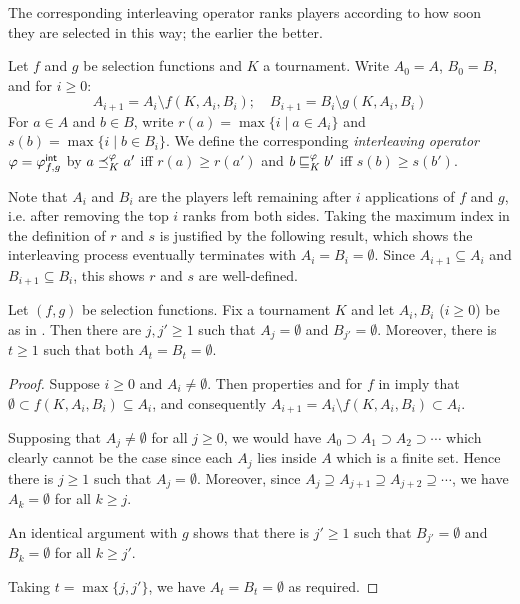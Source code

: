The corresponding interleaving operator ranks players according to how soon
they are selected in this way; the earlier the better.

\begin{definition}%
    \label{tourn_def_interleaving}

    Let $f$ and $g$ be selection functions and $K$ a tournament. Write $A_0
    = A$, $B_0 = B$, and for $i \ge 0$:
    \[
        A_{i+1} = A_i \setminus f(K, A_i, B_i);
        \quad
        B_{i+1} = B_i \setminus g(K, A_i, B_i)
    \]
    For $a \in A$ and $b \in B$, write $r(a) = \max{\{ i \mid a \in A_i \}}$
    and $s(b) = \max{\{ i \mid b \in B_i \}}$. We define the
    corresponding \emph{interleaving operator} $\varphi = {\varphi_{f,g}^\mathsf{int}}$ by $a
    \preceq_K^\varphi a'$ iff $r(a) \ge r(a')$ and $b \sqsubseteq_K^\varphi b'$ iff $s(b) \ge
    s(b')$.

\end{definition}

Note that $A_i$ and $B_i$ are the players left remaining after $i$ applications
of $f$ and $g$, i.e. after removing the top $i$ ranks from both sides. Taking
the maximum index in the definition of $r$ and $s$ is justified by the
following result, which shows the interleaving process eventually terminates
with $A_i = B_i = \emptyset$. Since $A_{i + 1} \subseteq A_i$ and $B_{i + 1}
\subseteq B_i$, this shows $r$ and $s$ are well-defined.

\begin{proposition}
    \label{tourn_prop_interleaving_terminates}

    Let $(f,g)$ be selection functions. Fix a tournament $K$ and let $A_i,
    B_i$ ($i \ge 0$) be as in . Then there are $j, j'
    \ge 1$ such that $A_j = \emptyset$ and $B_{j'} = \emptyset$. Moreover,
    there is $t \ge 1$ such that both $A_t = B_t = \emptyset$.

\end{proposition}

\begin{proof}

    Suppose $i \ge 0$ and $A_i \ne \emptyset$. Then properties
     and  for $f$ in
     imply that $\emptyset \subset f(K, A_i, B_i)
    \subseteq A_i$, and consequently $A_{i+1} = A_i \setminus f(K, A_i, B_i)
    \subset A_i$.

    Supposing that $A_j \ne \emptyset$ for all $j \ge 0$, we would have $A_0
    \supset A_1 \supset A_2 \supset \cdots$ which clearly cannot be the case
    since each $A_j$ lies inside $A$ which is a finite set. Hence there is $j
    \ge 1$ such that $A_j = \emptyset$. Moreover, since $A_j \supseteq A_{j+1}
    \supseteq A_{j+2} \supseteq \cdots$, we have $A_k = \emptyset$ for all $k
    \ge j$.

    An identical argument with $g$ shows that there is $j' \ge 1$ such that
    $B_{j'} = \emptyset$ and $B_k = \emptyset$ for all $k \ge j'$.

    Taking $t = \max\{j, j'\}$, we have $A_t = B_t = \emptyset$ as required.
\end{proof}

